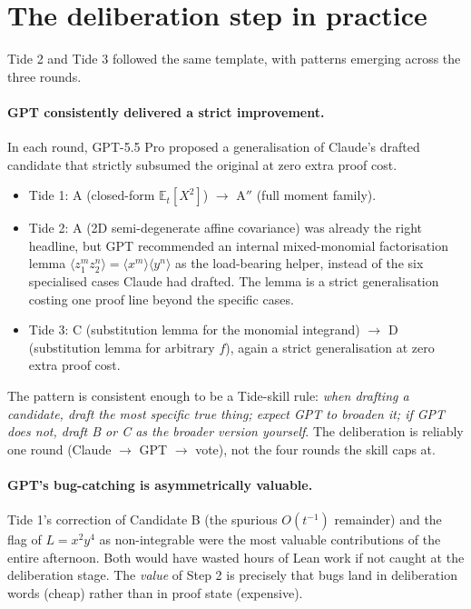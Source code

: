 \documentclass[11pt]{article}
\begin{document}
\section{The deliberation step in practice}

Tide 2 and Tide 3 followed the same template, with patterns emerging
across the three rounds.

\paragraph{GPT consistently delivered a strict improvement.} In each
round, GPT-5.5 Pro proposed a generalisation of Claude's drafted
candidate that strictly subsumed the original at zero extra proof
cost.

\begin{itemize}
\item Tide 1: A (closed-form $\mathbb{E}_t[X^2]$) $\to$ A$''$ (full
moment family).
\item Tide 2: A (2D semi-degenerate affine covariance) was already the
right headline, but GPT recommended an internal mixed-monomial
factorisation lemma $\langle z_1^m z_2^n\rangle = \langle x^m\rangle
\langle y^n\rangle$ as the load-bearing helper, instead of the six
specialised cases Claude had drafted. The lemma is a strict
generalisation costing one proof line beyond the specific cases.
\item Tide 3: C (substitution lemma for the monomial integrand) $\to$ D
(substitution lemma for arbitrary $f$), again a strict generalisation
at zero extra proof cost.
\end{itemize}

The pattern is consistent enough to be a Tide-skill rule: \emph{when
drafting a candidate, draft the most specific true thing; expect GPT to
broaden it; if GPT does not, draft B or C as the broader version
yourself}. The deliberation is reliably one round (Claude $\to$ GPT
$\to$ vote), not the four rounds the skill caps at.

\paragraph{GPT's bug-catching is asymmetrically valuable.} Tide 1's
correction of Candidate B (the spurious $O(t^{-1})$ remainder) and the
flag of $L = x^2 y^4$ as non-integrable were the most valuable
contributions of the entire afternoon. Both would have wasted hours of
Lean work if not caught at the deliberation stage. The
\emph{value} of Step 2 is precisely that bugs land in deliberation
words (cheap) rather than in proof state (expensive).
\end{document}
